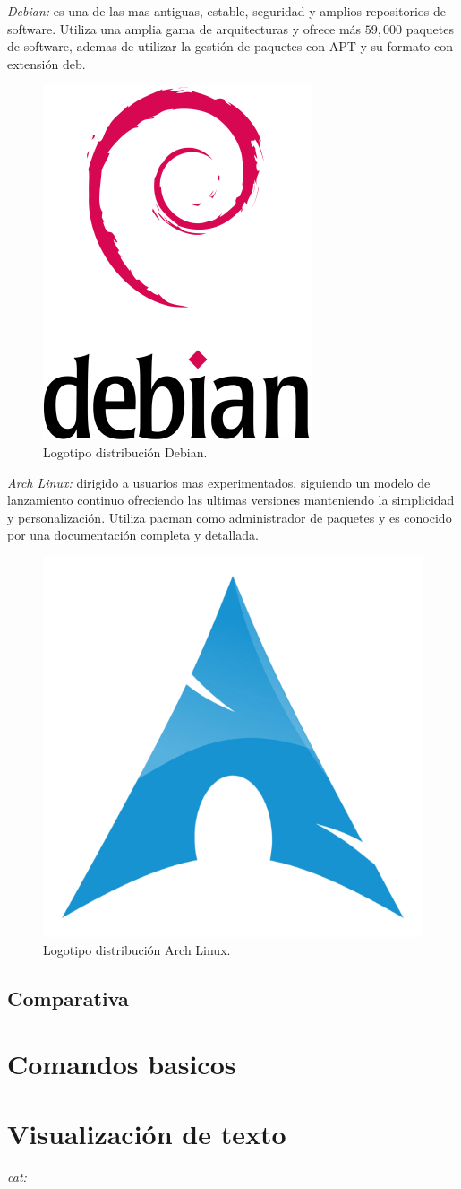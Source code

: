 \documentclass[10pt,a4paper,titlepage]{article}
\begin{document}
	\emph{Debian:} es una de las mas antiguas, estable, seguridad y amplios repositorios de software. Utiliza una amplia gama de arquitecturas y ofrece más $59,000$ paquetes de software, ademas de utilizar la gestión de paquetes con APT y su formato con extensión deb.
	\begin{figure}[H]
		\centering
		\includegraphics[width=0.3\linewidth]{"./images/debian.png"}
		\caption{Logotipo distribución Debian.}
		\label{fig:logoDebian}
	\end{figure}
	
	\emph{Arch Linux:} dirigido a usuarios mas experimentados, siguiendo un modelo de lanzamiento continuo ofreciendo las ultimas versiones manteniendo la simplicidad y personalización. Utiliza pacman como administrador de paquetes y es conocido por una documentación completa y detallada.
	\begin{figure}[H]
		\centering
		\includegraphics[width=0.3\linewidth]{"./images/arch.png"}
		\caption{Logotipo distribución Arch Linux.}
		\label{fig:logoArch}
	\end{figure}
	
	\subsection*{Comparativa}
	
	\section*{Comandos basicos}
	
	\section*{Visualización de texto}
	\emph{cat:} 
	
\end{document}
